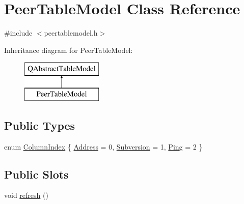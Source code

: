 \hypertarget{class_peer_table_model}{}\section{Peer\+Table\+Model Class Reference}
\label{class_peer_table_model}


{\ttfamily \#include $<$peertablemodel.\+h$>$}

Inheritance diagram for Peer\+Table\+Model\+:\begin{figure}[H]
\begin{center}
\leavevmode
\includegraphics[height=2.000000cm]{class_peer_table_model}
\end{center}
\end{figure}
\subsection*{Public Types}
\begin{DoxyCompactItemize}
\item 
enum \hyperlink{class_peer_table_model_a10a32ec5f31c9765c80b611760f7e590}{Column\+Index} \{ \hyperlink{class_peer_table_model_a10a32ec5f31c9765c80b611760f7e590a101063cc6b840d0857aa79929703d16a}{Address} = 0, 
\hyperlink{class_peer_table_model_a10a32ec5f31c9765c80b611760f7e590aa4408c536a178490700310f01cf0d455}{Subversion} = 1, 
\hyperlink{class_peer_table_model_a10a32ec5f31c9765c80b611760f7e590a7e5e92f542ecbb90307e99c213274957}{Ping} = 2
 \}
\end{DoxyCompactItemize}
\subsection*{Public Slots}
\begin{DoxyCompactItemize}
\item 
void \hyperlink{class_peer_table_model_abae14b3fd8a38a60f752f67a57b5b0b3}{refresh} ()
\end{DoxyCompactItemize}
